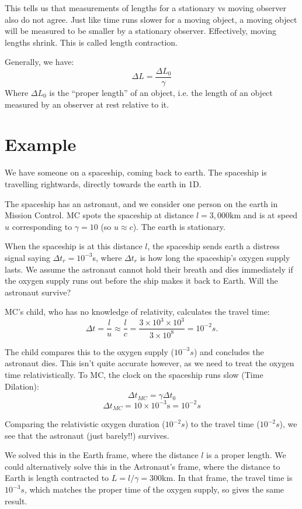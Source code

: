 This tells us that measurements of lengths for a stationary vs moving observer also do not agree. Just like time runs slower for a moving object, a moving object will be measured to be smaller by a stationary observer. Effectively, moving lengths shrink. This is called length contraction.

Generally, we have:
\[
    \boxed{\Delta L = \frac{\Delta L_0}{\gamma}}
\]
Where $\Delta L_0$ is the ``proper length'' of an object, i.e. the length of an object measured by an observer at rest relative to it.

\section{Example}
We have someone on a spaceship, coming back to earth. The spaceship is travelling rightwards, directly towards the earth in 1D.

The spaceship has an astronaut, and we consider one person on the earth in Mission Control. MC spots the spaceship at distance $l = 3,000 \text{km}$ and is at speed $u$ corresponding to $\gamma = 10$ (so $u \approx c$). The earth is stationary.

When the spaceship is at this distance $l$, the spaceship sends earth a distress signal saying $\Delta t_r = 10^{-3}$s, where $\Delta t_r$ is how long the spaceship's oxygen supply lasts. We assume the astronaut cannot hold their breath and dies immediately if the oxygen supply runs out before the ship makes it back to Earth. Will the astronaut survive?

MC's child, who has no knowledge of relativity, calculates the travel time:
\[
    \Delta t = \frac{l}{u} \approx \frac{l}{c} = \frac{3 \times 10^3 \times 10^3}{3 \times 10^8} = 10^{-2}s.
\]

The child compares this to the oxygen supply ($10^{-3}s$) and concludes the astronaut dies. This isn't quite accurate however, as we need to treat the oxygen time relativistically. To MC, the clock on the spaceship runs slow (Time Dilation):
\[
    \Delta t_{MC} = \gamma \Delta t_0
\]
\[
    \Delta t_{MC} = 10 \times 10^{-3} \text{s} = 10^{-2}s
\]

Comparing the relativistic oxygen duration ($10^{-2}s$) to the travel time ($10^{-2}s$), we see that the astronaut (just barely!!) survives. 

We solved this in the Earth frame, where the distance $l$ is a proper length. We could alternatively solve this in the Astronaut's frame, where the distance to Earth is length contracted to $L = l/\gamma = 300\text{km}$. In that frame, the travel time is $10^{-3}s$, which matches the proper time of the oxygen supply, so gives the same result.